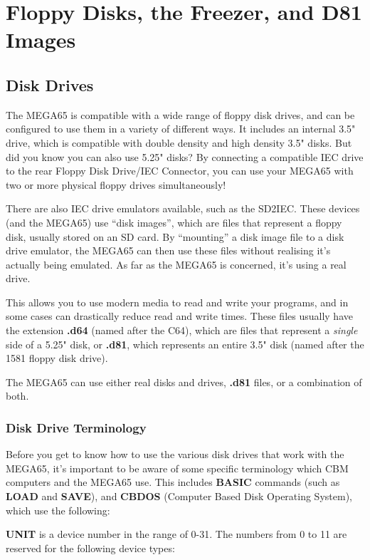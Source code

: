 \chapter{Floppy Disks, the Freezer, and D81 Images}
\label{cha:freezer}


\section{Disk Drives}
The MEGA65 is compatible with a wide range of floppy disk drives, and can be configured to use them in a variety
of different ways. It includes an internal 3.5" drive, which is compatible with double density and high density
3.5" disks. But did you know you can also use 5.25" disks? By connecting a compatible IEC drive to the rear
Floppy Disk Drive/IEC Connector, you can use your MEGA65 with two or more physical floppy drives simultaneously!

There are also IEC drive emulators available, such as the SD2IEC. These devices
(and the MEGA65) use ``disk images'', which are files that represent a floppy disk, usually stored on an SD card.
By ``mounting'' a disk image file to a disk drive emulator, the MEGA65 can then use these files without realising it's
actually being emulated. As far as the MEGA65 is concerned, it's using a real drive.

This allows you to use modern media to read and write your programs, and in some cases can drastically reduce
read and write times. These files usually have the extension {\bf .d64} (named after the C64), which are files that
represent a {\it single} side of a 5.25" disk, or {\bf .d81}, which represents an entire 3.5" disk (named after the
1581 floppy disk drive).

The MEGA65 can use either real disks and drives, {\bf .d81} files, or a combination of both.

\subsection{Disk Drive Terminology}
Before you get to know how to use the various disk drives that work with the MEGA65, it's important to be aware
of some specific terminology which CBM computers and the MEGA65 use. This includes {\bf BASIC} commands (such as
{\bf LOAD} and {\bf SAVE}), and {\bf CBDOS} (Computer Based Disk Operating System), which use the following:

{\bf UNIT} is a device number in the range of 0-31.
The numbers from 0 to 11 are reserved for the following device types:

